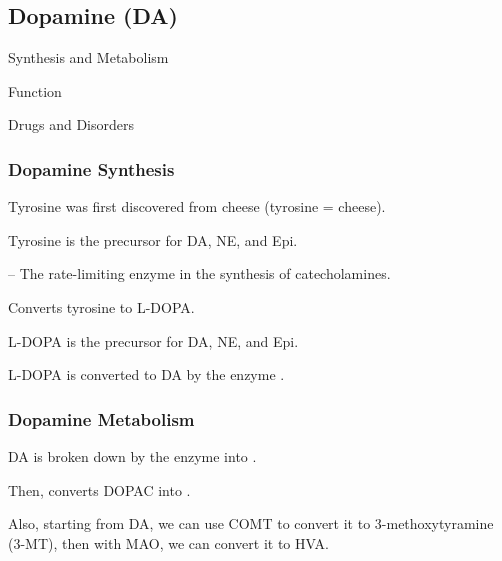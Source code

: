 \subsection{Dopamine (DA)}

\begin{coloredlist}
    \item Synthesis and Metabolism
    \item Function
    \item Drugs and Disorders
\end{coloredlist}

\subsubsection{Dopamine Synthesis}

\begin{coloredlist}
    \item Tyrosine was first discovered from cheese (tyrosine = cheese).
    \begin{coloredlist}
        \item Tyrosine is the precursor for DA, NE, and Epi.
        \item {} -- The rate-limiting enzyme in the synthesis of catecholamines.
        \begin{coloredlist}
            \item Converts tyrosine to L-DOPA.
            \item L-DOPA is the precursor for DA, NE, and Epi.
        \end{coloredlist}
        \item L-DOPA is converted to DA by the enzyme .
    \end{coloredlist}
\end{coloredlist}

\subsubsection{Dopamine Metabolism}

\begin{coloredlist}
    \item DA is broken down by the enzyme  into .
    \item Then,  converts DOPAC into .
    \item Also, starting from DA, we can use COMT to convert it to 3-methoxytyramine (3-MT), then with MAO, we can convert it to HVA.
\end{coloredlist}


